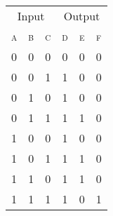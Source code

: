 \documentclass{standalone}
\begin{document}
\begin{tabular}{ccc|ccc}
		\multicolumn{3}{c|}{Input} & \multicolumn{3}{c}{Output} \\
		\textsc{a} & \textsc{b} & \textsc{c} & \textsc{d} & \textsc{e} & \textsc{f} \\\midrule
		0 & 0 & 0 & 0 & 0 & 0 \\
		0 & 0 & 1 & 1 & 0 & 0 \\
		0 & 1 & 0 & 1 & 0 & 0 \\
		0 & 1 & 1 & 1 & 1 & 0 \\
		1 & 0 & 0 & 1 & 0 & 0 \\
		1 & 0 & 1 & 1 & 1 & 0 \\
		1 & 1 & 0 & 1 & 1 & 0 \\
		1 & 1 & 1 & 1 & 0 & 1 \\
\end{tabular}
\end{document}
